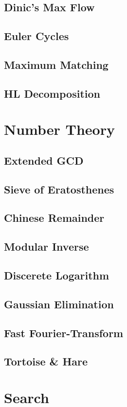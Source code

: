 \documentclass[twocolumn]{article}
\begin{document}
		\subsection{Dinic's Max Flow}
		\subsection{Euler Cycles}
		\subsection{Maximum Matching}
		\subsection{HL Decomposition}
	\section{Number Theory}
		\subsection{Extended GCD}
		\subsection{Sieve of Eratosthenes}
		\subsection{Chinese Remainder}
		\subsection{Modular Inverse}
		\subsection{Discerete Logarithm}
		\subsection{Gaussian Elimination}
		\subsection{Fast Fourier-Transform}
		
		\subsection{Tortoise \& Hare}
		
	\section{Search}
\end{document}
